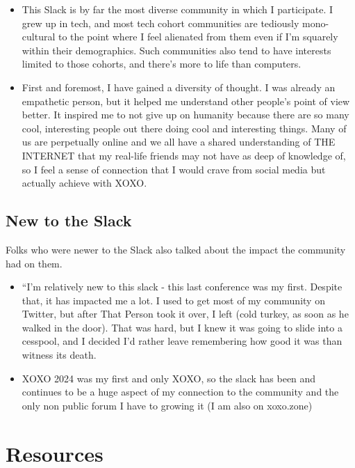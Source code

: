 \documentclass[
]{book}
\providecommand{\tightlist}{%
  \setlength{\itemsep}{0pt}\setlength{\parskip}{0pt}}
\begin{document}
\begin{itemize}
\tightlist
\item
  This Slack is by far the most diverse community in which I participate. I grew up in tech, and most tech cohort communities are tediously mono-cultural to the point where I feel alienated from them even if I'm squarely within their demographics. Such communities also tend to have interests limited to those cohorts, and there's more to life than computers.
\item
  First and foremost, I have gained a diversity of thought. I was already an empathetic person, but it helped me understand other people's point of view better. It inspired me to not give up on humanity because there are so many cool, interesting people out there doing cool and interesting things. Many of us are perpetually online and we all have a shared understanding of THE INTERNET that my real-life friends may not have as deep of knowledge of, so I feel a sense of connection that I would crave from social media but actually achieve with XOXO.
\end{itemize}

\subsection{New to the Slack}\label{new-to-the-slack}

Folks who were newer to the Slack also talked about the impact the community had on them.

\begin{itemize}
\tightlist
\item
  ``I'm relatively new to this slack - this last conference was my first. Despite that, it has impacted me a lot. I used to get most of my community on Twitter, but after That Person took it over, I left (cold turkey, as soon as he walked in the door). That was hard, but I knew it was going to slide into a cesspool, and I decided I'd rather leave remembering how good it was than witness its death.
\item
  XOXO 2024 was my first and only XOXO, so the slack has been and continues to be a huge aspect of my connection to the community and the only non public forum I have to growing it (I am also on xoxo.zone)
\end{itemize}

\section{Resources}\label{resources-1}
\end{document}
